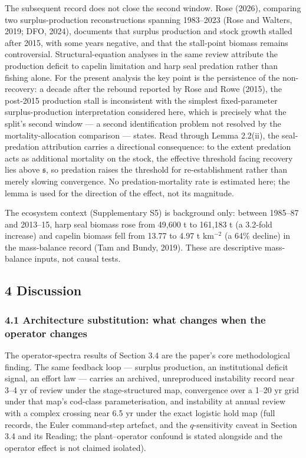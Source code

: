 \documentclass[11pt]{article}
\begin{document}
The subsequent record does not close the second window. Rose (2026),
comparing two surplus-production reconstructions spanning 1983--2023
(Rose and Walters, 2019; DFO, 2024), documents that surplus production
and stock growth stalled after 2015, with some years negative, and that
the stall-point biomass remains controversial. Structural-equation
analyses in the same review attribute the production deficit to capelin
limitation and harp seal predation rather than fishing alone. For the
present analysis the key point is the persistence of the
non-recovery: a decade after the rebound reported by Rose and Rowe
(2015), the post-2015 production stall is inconsistent with the simplest
fixed-parameter surplus-production interpretation considered here, which
is precisely what the split's second window --- a second identification
problem not resolved by the mortality-allocation comparison --- states. Read through Lemma 2.2(ii), the seal-predation attribution carries a directional consequence: to the extent predation acts as additional mortality on the stock, the effective threshold facing recovery lies above \(\mathfrak s\), so predation raises the threshold for re-establishment rather than merely slowing convergence. No predation-mortality rate is estimated here; the lemma is used for the direction of the effect, not its magnitude.

The ecosystem context (Supplementary S5) is background only: between 1985--87 and 2013--15,
harp seal biomass rose from 49,600 t to 161,183 t (a 3.2-fold increase)
and capelin biomass fell from 13.77 to 4.97 t km\(^{-2}\) (a 64\%
decline) in the mass-balance record (Tam and Bundy, 2019). These are
descriptive mass-balance inputs, not causal tests.

\subsection{4 Discussion}\label{discussion}

\subsubsection{4.1 Architecture substitution: what changes when the
operator
changes}\label{architecture-substitution-what-changes-when-the-operator-changes}

The operator-spectra results of Section 3.4 are the paper's core
methodological finding. The same feedback loop --- surplus production,
an institutional deficit signal, an effort law --- carries an archived,
unreproduced instability record near 3--4 yr of review under the
stage-structured map, convergence over a 1--20 yr grid under that map's
cod-class parameterisation, and instability at annual review with a
complex crossing near 6.5 yr under the exact logistic hold map (full
records, the Euler command-step artefact, and the \(q\)-sensitivity
caveat in Section 3.4 and its Reading; the plant--operator confound is
stated alongside and the operator effect is not claimed isolated).
\end{document}
